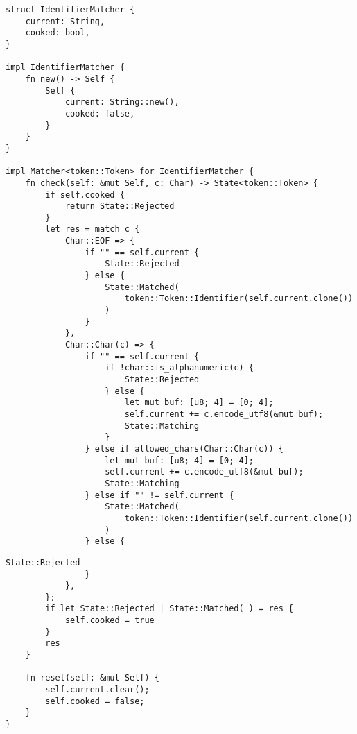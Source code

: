 \clearpage
\begin{lstlisting}[caption={Разбор идентификатора (часть 1)}, label={lst:rust_lexer_ident1}]
struct IdentifierMatcher {
    current: String,
    cooked: bool,
}

impl IdentifierMatcher {
    fn new() -> Self {
        Self {
            current: String::new(),
            cooked: false,
        }
    }
}

impl Matcher<token::Token> for IdentifierMatcher {
    fn check(self: &mut Self, c: Char) -> State<token::Token> {
        if self.cooked {
            return State::Rejected
        }
        let res = match c {
            Char::EOF => {
                if "" == self.current {
                    State::Rejected
                } else {
                    State::Matched(
                        token::Token::Identifier(self.current.clone())
                    )
                }
            },
            Char::Char(c) => {
                if "" == self.current {
                    if !char::is_alphanumeric(c) {
                        State::Rejected
                    } else {
                        let mut buf: [u8; 4] = [0; 4];
                        self.current += c.encode_utf8(&mut buf);
                        State::Matching
                    }
                } else if allowed_chars(Char::Char(c)) {
                    let mut buf: [u8; 4] = [0; 4];
                    self.current += c.encode_utf8(&mut buf);
                    State::Matching
                } else if "" != self.current {
                    State::Matched(
                        token::Token::Identifier(self.current.clone())
                    )
                } else {
\end{lstlisting}
\clearpage
\begin{lstlisting}[caption={Разбор идентификатора (часть 2)}, label={lst:rust_lexer_ident2}]
                    State::Rejected
                }
            },
        };
        if let State::Rejected | State::Matched(_) = res {
            self.cooked = true
        }
        res
    }

    fn reset(self: &mut Self) {
        self.current.clear();
        self.cooked = false;
    }
}
\end{lstlisting}

